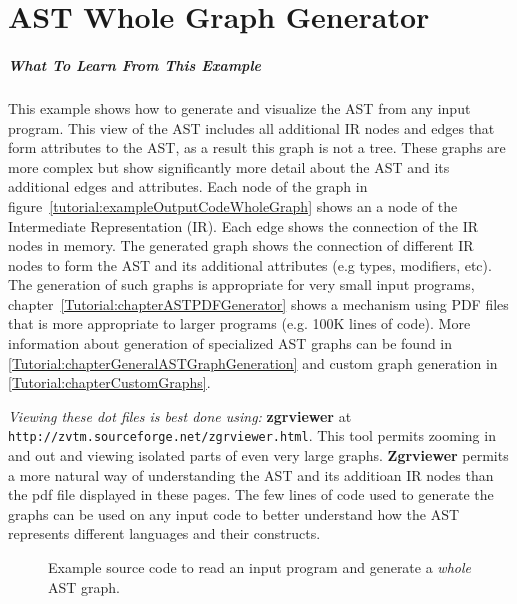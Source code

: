 \chapter{AST Whole Graph Generator}
\label{Tutorial:chapterASTWholeGraphGenerator}

\paragraph{What To Learn From This Example}
This example shows how to generate and visualize the AST from any input program.
This view of the AST includes all additional IR nodes and edges that form attributes to
the AST, as a result this graph is not a tree.  These graphs are more complex but
show significantly more detail about the AST and its additional edges and attributes.
Each node of the graph in figure~\ref{tutorial:exampleOutputCodeWholeGraph} shows
an a node of the Intermediate Representation (IR).  Each edge shows the connection
of the IR nodes in memory. The generated graph shows the connection of different 
IR nodes to form the AST and its additional attributes (e.g types, modifiers, etc).  
The generation of such graphs is appropriate for very small 
input programs, chapter~\ref{Tutorial:chapterASTPDFGenerator} shows a mechanism 
using PDF files that is more appropriate to larger programs (e.g. 100K lines of code).
More information about generation of specialized AST graphs can be found in 
\ref{Tutorial:chapterGeneralASTGraphGeneration} and custom graph generation in
\ref{Tutorial:chapterCustomGraphs}.

   {\em Viewing these dot files is best done using:} {\bf zgrviewer} at 
{\tt http://zvtm.sourceforge.net/zgrviewer.html}.  This tool permits zooming
in and out and viewing isolated parts of even very large graphs. {\bf Zgrviewer} permits 
a more natural way of understanding the AST and its additioan IR nodes than the 
pdf file displayed in these pages.  The few lines of code used to generate the
graphs can be used on any input code to better understand how the AST represents
different languages and their constructs.

\begin{figure}[!h]
{\indent
{\mySmallFontSize

\begin{latexonly}
   
\end{latexonly}

\begin{htmlonly}
   
\end{htmlonly}

}
}
\caption{Example source code to read an input program and generate a {\em whole} AST graph.}
\label{Tutorial:exampleASTWholeGraphGenerator}
\end{figure}

